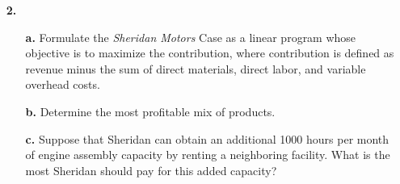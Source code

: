 \documentclass[ 12pt ]{article}
\begin{document}
\begin{enumerate}
\begin{proof}[Solution]
\begin{center}
			\end{center}
			We can see that the slope our of objective function is $-\frac{1}{5}$ which is bounded between $-\frac{1}{3}$ and $-\frac{1}{8}$, the slopes of our weight and volume
			constraints, respectively. Therefore, our optimal value lies at their intersection, $(24, 12)$, providing 5040 rupees.
		\end{proof}


	\item[\textbf{2.}]
		\begin{enumerate}
			\item[\textbf{a.}] Formulate the \textit{Sheridan Motors} Case as a linear program whose objective is to maximize the contribution, where contribution is defined as revenue
				minus the sum of direct materials, direct labor, and variable overhead costs.
			\item[\textbf{b.}] Determine the most profitable mix of products.
			\item[\textbf{c.}] Suppose that Sheridan can obtain an additional 1000 hours per month of engine assembly capacity by renting a neighboring facility. What is the most
				Sheridan should pay for this added capacity?
		\end{enumerate}


\end{enumerate}
\end{document}
